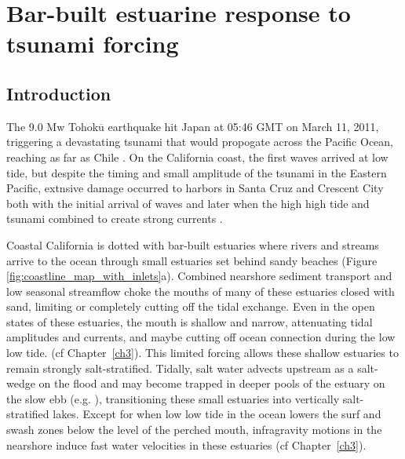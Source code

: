 \chapter{Bar-built estuarine response to tsunami forcing}
\label{chTsunami}




\section{Introduction}

The 9.0 Mw Tohok$\overline{\mathrm{u}}$ earthquake hit Japan at 05:46 GMT on March 11, 2011,
triggering a devastating tsunami that would propogate across the Pacific
Ocean, reaching as far as Chile \parencite{mori_survey_2011,lagos_magnitude_2011}. On the California coast, the first waves arrived at low tide, but despite
the timing and small amplitude of the tsunami in the Eastern Pacific,
extnsive damage occurred to harbors in Santa Cruz and Crescent City
both with the initial arrival of waves and later when the high high
tide and tsunami combined to create strong currents \parencite{wilson_observations_2012}.

Coastal California is dotted with bar-built estuaries where rivers
and streams arrive to the ocean through small estuaries set behind
sandy beaches (Figure \ref{fig:coastline_map_with_inlets}a). Combined
nearshore sediment transport and low seasonal streamflow choke the
mouths of many of these estuaries closed with sand, limiting or completely
cutting off the tidal exchange. Even in the open states of these estuaries,
the mouth is shallow and narrow, attenuating tidal amplitudes and
currents, and maybe cutting off ocean connection during the low low
tide. (cf Chapter~\ref{ch3}). This limited forcing allows
these shallow estuaries to remain strongly salt-stratified. Tidally,
salt water advects upstream as a salt-wedge on the flood and may become
trapped in deeper pools of the estuary on the slow ebb (e.g. \cite{largier_dynamics_1991,ranasinghe_circulation_1999}),
transitioning these small estuaries into vertically salt-stratified
lakes. Except for when low low tide in the ocean lowers the surf and
swash zones below the level of the perched mouth, infragravity motions
in the nearshore induce fast water velocities in these estuaries (cf Chapter~\ref{ch3}). 



